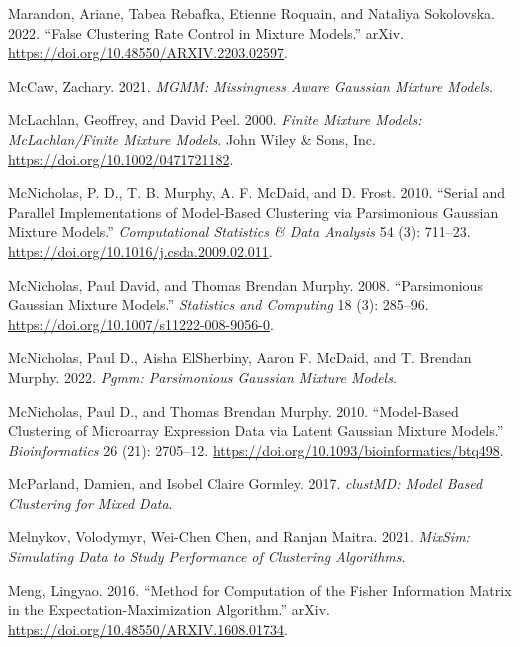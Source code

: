 \begin{CSLReferences}{1}{0}
\leavevmode{}%
Marandon, Ariane, Tabea Rebafka, Etienne Roquain, and Nataliya Sokolovska. 2022. {``False Clustering Rate Control in Mixture Models.''} arXiv. \url{https://doi.org/10.48550/ARXIV.2203.02597}.

\leavevmode{}%
McCaw, Zachary. 2021. \emph{MGMM: Missingness Aware Gaussian Mixture Models}.

\leavevmode{}%
McLachlan, Geoffrey, and David Peel. 2000. \emph{Finite {Mixture Models}: {McLachlan}/{Finite Mixture Models}}. {John Wiley \& Sons, Inc.} \url{https://doi.org/10.1002/0471721182}.

\leavevmode{}%
McNicholas, P. D., T. B. Murphy, A. F. McDaid, and D. Frost. 2010. {``Serial and Parallel Implementations of Model-Based Clustering via Parsimonious Gaussian Mixture Models.''} \emph{Computational Statistics \& Data Analysis} 54 (3): 711--23. \url{https://doi.org/10.1016/j.csda.2009.02.011}.

\leavevmode{}%
McNicholas, Paul David, and Thomas Brendan Murphy. 2008. {``Parsimonious Gaussian Mixture Models.''} \emph{Statistics and Computing} 18 (3): 285--96. \url{https://doi.org/10.1007/s11222-008-9056-0}.

\leavevmode{}%
McNicholas, Paul D., Aisha ElSherbiny, Aaron F. McDaid, and T. Brendan Murphy. 2022. \emph{Pgmm: Parsimonious Gaussian Mixture Models}.

\leavevmode{}%
McNicholas, Paul D., and Thomas Brendan Murphy. 2010. {``Model-Based Clustering of Microarray Expression Data via Latent Gaussian Mixture Models.''} \emph{Bioinformatics} 26 (21): 2705--12. \url{https://doi.org/10.1093/bioinformatics/btq498}.

\leavevmode{}%
McParland, Damien, and Isobel Claire Gormley. 2017. \emph{clustMD: Model Based Clustering for Mixed Data}.

\leavevmode{}%
Melnykov, Volodymyr, Wei-Chen Chen, and Ranjan Maitra. 2021. \emph{MixSim: Simulating Data to Study Performance of Clustering Algorithms}.

\leavevmode{}%
Meng, Lingyao. 2016. {``Method for Computation of the Fisher Information Matrix in the Expectation-Maximization Algorithm.''} arXiv. \url{https://doi.org/10.48550/ARXIV.1608.01734}.


\end{CSLReferences}
